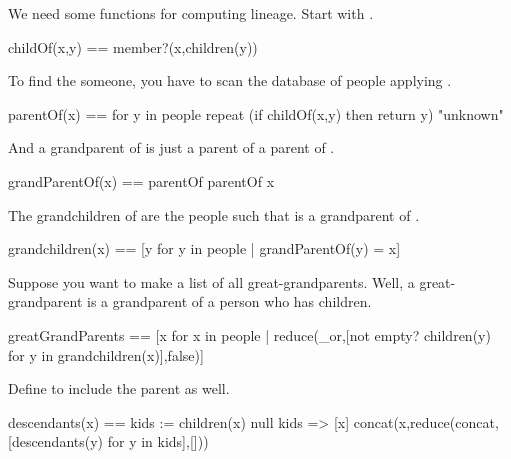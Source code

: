 \begin{xtc}
\begin{xtccomment}
We need some functions for computing lineage.
Start with .
\end{xtccomment}
\begin{spadsrc}
childOf(x,y) == member?(x,children(y))
\end{spadsrc}
\end{xtc}
\begin{xtc}
\begin{xtccomment}
To find the  someone,
you have to scan the database of
people applying .
\end{xtccomment}
\begin{spadsrc}
parentOf(x) ==
  for y in people repeat
    (if childOf(x,y) then return y)
  "unknown"
\end{spadsrc}
\end{xtc}
\begin{xtc}
\begin{xtccomment}
And a grandparent of  is just a parent of a parent of .
\end{xtccomment}
\begin{spadsrc}
grandParentOf(x) == parentOf parentOf x
\end{spadsrc}
\end{xtc}
\begin{xtc}
\begin{xtccomment}
The grandchildren of 
are the people  such that
 is a grandparent of .
\end{xtccomment}
\begin{spadsrc}
grandchildren(x) == [y for y in people | grandParentOf(y) = x]
\end{spadsrc}
\end{xtc}
\begin{xtc}
\begin{xtccomment}
Suppose you want to make a list of all great-grandparents.
Well, a great-grandparent is a grandparent of a person who has children.
\end{xtccomment}
\begin{spadsrc}
greatGrandParents == [x for x in people |
  reduce(_or,[not empty? children(y) for y in grandchildren(x)],false)]
\end{spadsrc}
\end{xtc}
\begin{xtc}
\begin{xtccomment}
Define  to include the parent as well.
\end{xtccomment}
\begin{spadsrc}
descendants(x) ==
  kids := children(x)
  null kids => [x]
  concat(x,reduce(concat,[descendants(y)
    for y in kids],[]))
\end{spadsrc}
\end{xtc}
